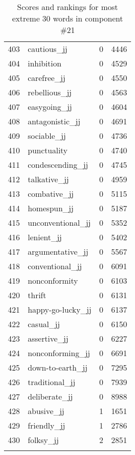 \begin{longtable}[!htbp]{| rlr@{.}l |}
    403 & cautious\_jj & 0 & 4446 \\
    404 & inhibition & 0 & 4529 \\
    405 & carefree\_jj & 0 & 4550 \\
    406 & rebellious\_jj & 0 & 4563 \\
    407 & easygoing\_jj & 0 & 4604 \\
    408 & antagonistic\_jj & 0 & 4691 \\
    409 & sociable\_jj & 0 & 4736 \\
    410 & punctuality & 0 & 4740 \\
    411 & condescending\_jj & 0 & 4745 \\
    412 & talkative\_jj & 0 & 4959 \\
    413 & combative\_jj & 0 & 5115 \\
    414 & homespun\_jj & 0 & 5187 \\
    415 & unconventional\_jj & 0 & 5352 \\
    416 & lenient\_jj & 0 & 5402 \\
    417 & argumentative\_jj & 0 & 5567 \\
    418 & conventional\_jj & 0 & 6091 \\
    419 & nonconformity & 0 & 6103 \\
    420 & thrift & 0 & 6131 \\
    421 & happy-go-lucky\_jj & 0 & 6137 \\
    422 & casual\_jj & 0 & 6150 \\
    423 & assertive\_jj & 0 & 6227 \\
    424 & nonconforming\_jj & 0 & 6691 \\
    425 & down-to-earth\_jj & 0 & 7295 \\
    426 & traditional\_jj & 0 & 7939 \\
    427 & deliberate\_jj & 0 & 8988 \\
    428 & abusive\_jj & 1 & 1651 \\
    429 & friendly\_jj & 1 & 2786 \\
    430 & folksy\_jj & 2 & 2851 \\
    \hline
    \caption{Scores and rankings for most extreme 30 words in component \#21} \\
\end{longtable}
